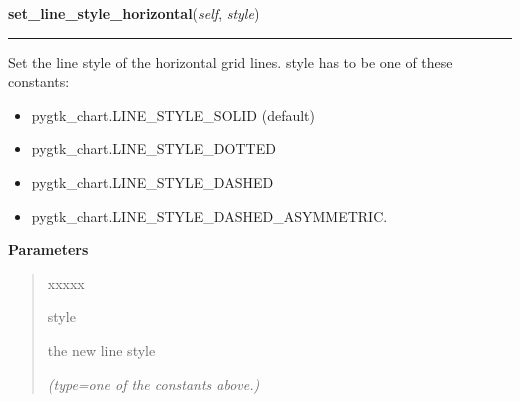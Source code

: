     \label{pygtk_chart:line_chart:Grid:set_line_style_horizontal}

    \vspace{0.5ex}

\hspace{.8\funcindent}\begin{boxedminipage}{\funcwidth}

    \raggedright \textbf{set\_line\_style\_horizontal}(\textit{self}, \textit{style})

    \vspace{-1.5ex}

    \rule{\textwidth}{0.5\fboxrule}
\setlength{\parskip}{2ex}
    Set the line style of the horizontal grid lines. style has to be one of
    these constants:

    \begin{itemize}
    \setlength{\parskip}{0.6ex}
      \item pygtk\_chart.LINE\_STYLE\_SOLID (default)

      \item pygtk\_chart.LINE\_STYLE\_DOTTED

      \item pygtk\_chart.LINE\_STYLE\_DASHED

      \item pygtk\_chart.LINE\_STYLE\_DASHED\_ASYMMETRIC.

    \end{itemize}

\setlength{\parskip}{1ex}
      \textbf{Parameters}
      \vspace{-1ex}

      \begin{quote}
        \begin{Ventry}{xxxxx}

          \item[style]

          the new line style

            {\it (type=one of the constants above.)}

        \end{Ventry}

      \end{quote}

    \end{boxedminipage}


